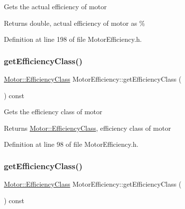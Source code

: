 Gets the actual efficiency of motor

\begin{DoxyReturn}{Returns}
double, actual efficiency of motor as \% 
\end{DoxyReturn}


Definition at line 198 of file Motor\+Efficiency.\+h.

\mbox{\label{class_motor_efficiency_a9eb7d5c2fc598f655c1a3d12790e4d17}} 
\subsubsection{\texorpdfstring{get\+Efficiency\+Class()}{getEfficiencyClass()}\hspace{0.1cm}{\footnotesize\ttfamily [1/3]}}
{\footnotesize\ttfamily \hyperlink{class_motor_afa022971ae062406a9f588c601673d4e}{Motor\+::\+Efficiency\+Class} Motor\+Efficiency\+::get\+Efficiency\+Class (\begin{DoxyParamCaption}{ }\end{DoxyParamCaption}) const\hspace{0.3cm}{\ttfamily [inline]}}

Gets the efficiency class of motor

\begin{DoxyReturn}{Returns}
\hyperlink{class_motor_afa022971ae062406a9f588c601673d4e}{Motor\+::\+Efficiency\+Class}, efficiency class of motor 
\end{DoxyReturn}


Definition at line 98 of file Motor\+Efficiency.\+h.

\mbox{\label{class_motor_efficiency_a9eb7d5c2fc598f655c1a3d12790e4d17}} 
\subsubsection{\texorpdfstring{get\+Efficiency\+Class()}{getEfficiencyClass()}\hspace{0.1cm}{\footnotesize\ttfamily [2/3]}}
{\footnotesize\ttfamily \hyperlink{class_motor_afa022971ae062406a9f588c601673d4e}{Motor\+::\+Efficiency\+Class} Motor\+Efficiency\+::get\+Efficiency\+Class (\begin{DoxyParamCaption}{ }\end{DoxyParamCaption}) const\hspace{0.3cm}{\ttfamily [inline]}}

